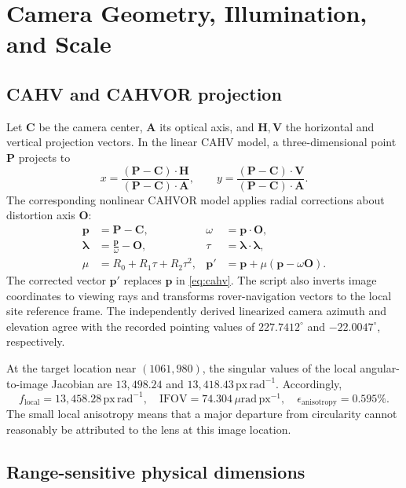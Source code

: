 \documentclass[11pt,letterpaper]{article}
\newcommand{\mat}[1]{\mathbf{#1}}
\begin{document}
\section{Camera Geometry, Illumination, and Scale}
\label{sec:camera}

\subsection{CAHV and CAHVOR projection}

Let \(\mat C\) be the camera center, \(\mat A\) its optical axis, and \(\mat H,\mat V\) the horizontal and vertical projection vectors. In the linear CAHV model, a three-dimensional point \(\mat P\) projects to
\begin{equation}
 x=\frac{(\mat P-\mat C)\cdot\mat H}{(\mat P-\mat C)\cdot\mat A},\qquad
 y=\frac{(\mat P-\mat C)\cdot\mat V}{(\mat P-\mat C)\cdot\mat A}.
 \label{eq:cahv}
\end{equation}
The corresponding nonlinear CAHVOR model applies radial corrections about distortion axis \(\mat O\):
\begin{align}
\mat p&=\mat P-\mat C, & \omega&=\mat p\cdot\mat O, \\
\boldsymbol{\lambda}&=\frac{\mat p}{\omega}-\mat O, & \tau&=\boldsymbol{\lambda}\cdot\boldsymbol{\lambda},\\
\mu&=R_0+R_1\tau+R_2\tau^2, &
\mat p'&=\mat p+\mu(\mat p-\omega\mat O).
\end{align}
The corrected vector \(\mat p'\) replaces \(\mat p\) in \cref{eq:cahv}. The script also inverts image coordinates to viewing rays and transforms rover-navigation vectors to the local site reference frame. The independently derived linearized camera azimuth and elevation agree with the recorded pointing values of \(227.7412^\circ\) and \(-22.0047^\circ\), respectively.

At the target location near \((1061,980)\), the singular values of the local angular-to-image Jacobian are \(13{,}498.24\) and \(13{,}418.43\,\mathrm{px\,rad^{-1}}\). Accordingly,
\begin{equation}
 f_{\mathrm{local}}=13{,}458.28\,\mathrm{px\,rad^{-1}},\quad
 \mathrm{IFOV}=74.304\,\mu\mathrm{rad\,px^{-1}},\quad
 \epsilon_{\mathrm{anisotropy}}=0.595\%.
\end{equation}
The small local anisotropy means that a major departure from circularity cannot reasonably be attributed to the lens at this image location.

\subsection{Range-sensitive physical dimensions}
\end{document}
